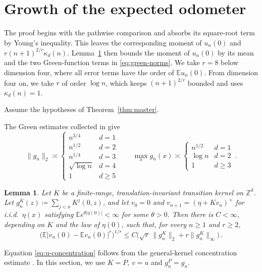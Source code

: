 \documentclass[11pt]{amsart}
\theoremstyle{plain}
\newtheorem{lemma}[theorem]{Lemma}
\theoremstyle{definition}
\newcommand{\Z}{\mathbb{Z}}
\newcommand{\E}{\mathbb{E}}
\begin{document}
\section{Growth of the expected odometer}\label{sec:bounds}

The proof begins with the pathwise comparison and absorbs its square-root term
by Young's inequality. This leaves the corresponding moment of $u_n(0)$ and
$r(n+1)^{2/r}\kappa_d(n)$.
Lemma~\ref{lem:u-concentration} then bounds the moment of $u_n(0)$ by its mean
and the two Green-function terms in
\eqref{eq:green-norms}. We take $r=8$ below dimension four, where all error
terms have the order of $\E u_n(0)$. From dimension four on, we take $r$ of
order $\log n$, which keeps $(n+1)^{2/r}$ bounded and uses $\kappa_d(n)=1$.

Assume the hypotheses of Theorem~\ref{thm:master}.

The Green estimates collected in \citet[Section~3.1]{BP} give
\begin{equation}\label{eq:green-norms}
	\|g_n\|_2\asymp
	\begin{cases}
		n^{3/4}&d=1\\
		n^{1/2}&d=2\\
		n^{1/4}&d=3\\
		\sqrt{\log n}&d=4\\
		1&d\geq5
	\end{cases}
	\qquad
	\max_xg_n(x)\asymp
	\begin{cases}
		n^{1/2}&d=1\\
		\log n&d=2\\
		1&d\geq3
	\end{cases}
	\,.
\end{equation}

\begin{lemma}\label{lem:u-concentration}
	Let $K$ be a finite-range, translation-invariant transition kernel on
	$\Z^d$. Let $g_n^K(z)\coloneqq\sum_{j<n}K^j(0,z)$, and let
	$v_0=0$ and $v_{n+1}=(\eta+Kv_n)^+$ for i.i.d.\ $\eta(x)$ satisfying
	$\E e^{\theta|\eta(0)|}<\infty$ for some $\theta>0$. Then there is
	$C<\infty$, depending on $K$ and the law of $\eta(0)$, such that, for every
	$n\geq1$ and $r\geq2$,
	\begin{equation}\label{eq:u-concentration}
		\bigl(\E|v_n(0)-\E v_n(0)|^r\bigr)^{1/r}
		\leq C\bigl(\sqrt r\,\|g_n^K\|_2+r\|g_n^K\|_\infty\bigr)\,.
	\end{equation}
\end{lemma}

Equation \eqref{eq:u-concentration} follows from the general-kernel concentration estimate \citep[Remark~3.4]{BP}. In this section,
we use $K=P$, $v=u$ and $g_n^P=g_n$.
\end{document}

